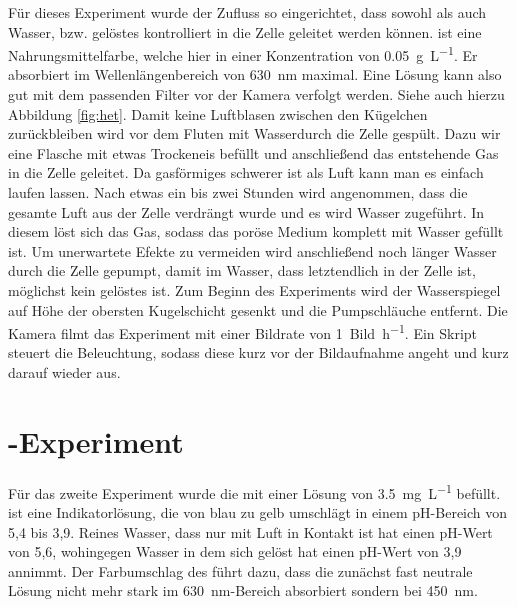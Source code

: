 Für dieses Experiment wurde der Zufluss so eingerichtet, dass sowohl \COT als auch Wasser, bzw. gelöstes \BB kontrolliert in die Zelle geleitet werden können. \BB ist eine Nahrungsmittelfarbe, welche hier in einer Konzentration von \SI{0,05}{\gram\per\liter}. Er absorbiert im Wellenlängenbereich von \SI{630}{\nano\meter} maximal. Eine \BB Lösung kann also gut mit dem passenden Filter vor der Kamera verfolgt werden. Siehe auch hierzu Abbildung \ref{fig:het}.
Damit keine Luftblasen zwischen den Kügelchen zurückbleiben wird vor dem Fluten mit Wasser\COT durch die Zelle gespült. Dazu wir eine Flasche mit etwas Trockeneis befüllt und anschließend das entstehende Gas in die Zelle geleitet. Da gasförmiges \COT schwerer ist als Luft kann man es einfach laufen lassen. Nach etwas ein bis zwei Stunden wird angenommen, dass die gesamte Luft aus der Zelle verdrängt wurde und es wird Wasser zugeführt. In diesem löst sich das Gas, sodass das poröse Medium komplett mit Wasser gefüllt ist. Um unerwartete Efekte zu vermeiden wird anschließend noch länger Wasser durch die Zelle gepumpt, damit im Wasser, dass letztendlich in der Zelle ist, möglichst kein gelöstes \COT ist.
Zum Beginn des Experiments wird der Wasserspiegel auf Höhe der obersten Kugelschicht gesenkt und die Pumpschläuche entfernt.
Die Kamera filmt das Experiment mit einer Bildrate von \SI{1}{Bild\per\hour}. Ein Skript steuert die Beleuchtung, sodass diese kurz vor der Bildaufnahme angeht und kurz darauf wieder aus.



\section{\COT-Experiment}
\label{sec:cot}
Für das zweite Experiment wurde die \HSCs mit einer \BCG Lösung von \SI{3,5}{\milli\gram\per\liter} befüllt. 
\BCG ist eine Indikatorlösung, die von blau zu gelb umschlägt in einem pH-Bereich von 5,4 bis 3,9. Reines Wasser, dass nur mit Luft in Kontakt ist hat einen pH-Wert von 5,6, wohingegen Wasser in dem sich \COT gelöst hat einen pH-Wert von 3,9 annimmt. 
Der Farbumschlag des \BCG führt dazu, dass die zunächst fast neutrale Lösung nicht mehr stark im \SI{630}{\nano\meter}-Bereich absorbiert sondern bei \SI{450}{\nano\meter}. 


